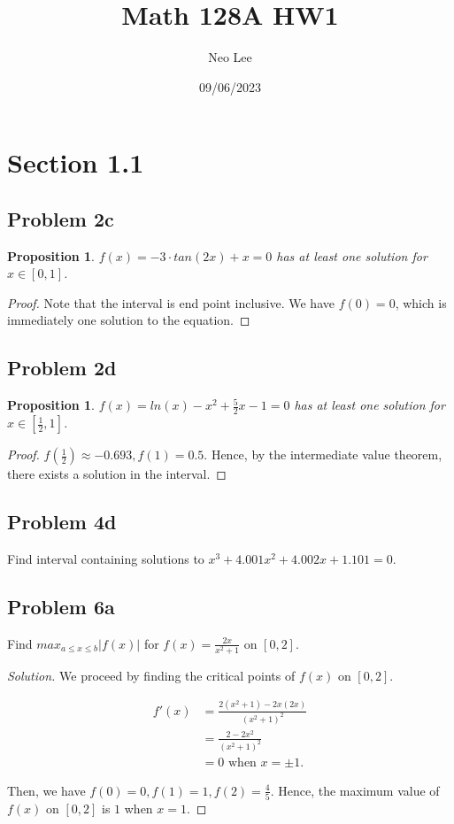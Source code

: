 \documentclass{article}
\title{Math 128A HW1}
\author{Neo Lee}
\date{09/06/2023}
\newtheorem{proposition}[thm]{Proposition}
\begin{document}
 

\maketitle 

\section*{Section 1.1}
\subsection*{Problem 2c}
\begin{proposition}
    $f(x) = -3\cdot tan(2x) + x = 0$ has at least one solution for $x \in [0,1]$.
\end{proposition}
\begin{proof}
    Note that the interval is end point inclusive. 
    We have $f(0) = 0$, which is immediately one solution to the equation.
\end{proof}

\subsection*{Problem 2d}
\begin{proposition}
    $f(x) = ln(x)-x^2+\frac{5}{2}x - 1 = 0$ has at least one solution for $x \in [\frac{1}{2},1]$.
\end{proposition}
\begin{proof}
    $f(\frac{1}{2}) \approx -0.693, f(1) = 0.5$. Hence, by the intermediate value theorem, there 
    exists a solution in the interval.
\end{proof}

\subsection*{Problem 4d}
Find interval containing solutions to $x^3 + 4.001x^2 + 4.002x + 1.101 = 0$.

\subsection*{Problem 6a}
Find $max_{a\le x\le b}|f(x)|$ for $f(x) = \frac{2x}{x^2+1}$ on $[0,2]$.
\begin{proof}[Solution]
    We proceed by finding the critical points of $f(x)$ on $[0,2]$.

    \begin{align*}
        f'(x) & = \frac{2(x^2+1) - 2x(2x)}{(x^2+1)^2} \\
              & = \frac{2 - 2x^2}{(x^2+1)^2} \\
              & = 0 \text{ when } x = \pm 1.
    \end{align*}

    Then, we have $f(0) = 0, f(1) = 1, f(2) = \frac{4}{5}$. Hence, the maximum value of $f(x)$ on 
    $[0,2]$ is $1$ when $x=1$.
\end{proof}
\end{document}
